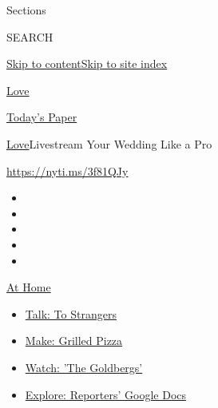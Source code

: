 Sections

SEARCH

\protect\hyperlink{site-content}{Skip to
content}\protect\hyperlink{site-index}{Skip to site index}

\href{https://www.nytimes3xbfgragh.onion/section/fashion/weddings}{Love}

\href{https://myaccount.nytimes3xbfgragh.onion/auth/login?response_type=cookie\&client_id=vi}{}

\href{https://www.nytimes3xbfgragh.onion/section/todayspaper}{Today's
Paper}

\href{/section/fashion/weddings}{Love}\textbar{}Livestream Your Wedding
Like a Pro

\url{https://nyti.ms/3f81QJy}

\begin{itemize}
\item
\item
\item
\item
\item
\end{itemize}

\href{https://www.nytimes3xbfgragh.onion/spotlight/at-home?action=click\&pgtype=Article\&state=default\&region=TOP_BANNER\&context=at_home_menu}{At
Home}

\begin{itemize}
\tightlist
\item
  \href{https://www.nytimes3xbfgragh.onion/2020/08/03/well/family/the-benefits-of-talking-to-strangers.html?action=click\&pgtype=Article\&state=default\&region=TOP_BANNER\&context=at_home_menu}{Talk:
  To Strangers}
\item
  \href{https://www.nytimes3xbfgragh.onion/2020/08/01/at-home/coronavirus-make-pizza-on-a-grill.html?action=click\&pgtype=Article\&state=default\&region=TOP_BANNER\&context=at_home_menu}{Make:
  Grilled Pizza}
\item
  \href{https://www.nytimes3xbfgragh.onion/2020/07/31/arts/television/goldbergs-abc-stream.html?action=click\&pgtype=Article\&state=default\&region=TOP_BANNER\&context=at_home_menu}{Watch:
  'The Goldbergs'}
\item
  \href{https://www.nytimes3xbfgragh.onion/interactive/2020/at-home/even-more-reporters-editors-diaries-lists-recommendations.html?action=click\&pgtype=Article\&state=default\&region=TOP_BANNER\&context=at_home_menu}{Explore:
  Reporters' Google Docs}
\end{itemize}

